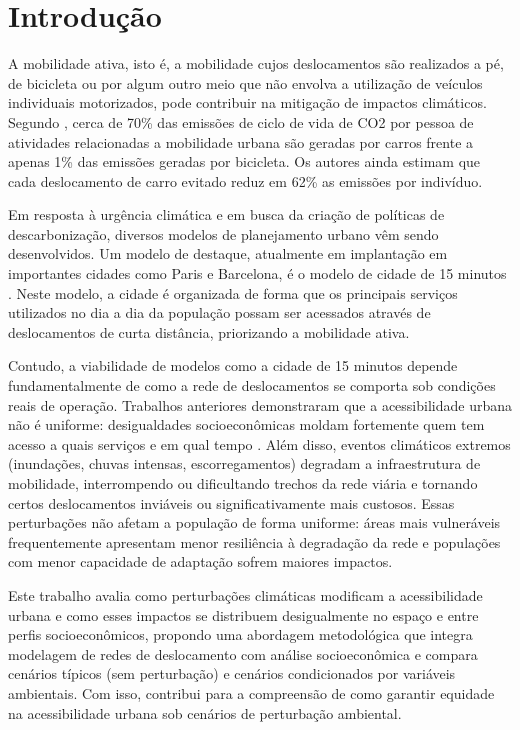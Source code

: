 \section{Introdução}

A mobilidade ativa, isto é, a mobilidade cujos deslocamentos são realizados a pé, de bicicleta ou por algum outro meio que não envolva a utilização de veículos individuais motorizados, pode contribuir na mitigação de impactos climáticos. Segundo \cite{BRAND2021102764}, cerca de 70\% das emissões de ciclo de vida de CO2 por pessoa de atividades relacionadas a mobilidade urbana são geradas por carros frente a apenas 1\% das emissões geradas por bicicleta. Os autores ainda estimam que cada deslocamento de carro evitado reduz em 62\% as emissões por indivíduo.

Em resposta à urgência climática e em busca da criação de políticas de descarbonização, diversos modelos de planejamento urbano vêm sendo desenvolvidos. Um modelo de destaque, atualmente em implantação em importantes cidades como Paris e Barcelona, é o modelo de cidade de 15 minutos \cite{Allam2022-yx}. Neste modelo, a cidade é organizada de forma que os principais serviços utilizados no dia a dia da população possam ser acessados através de deslocamentos de curta distância, priorizando a mobilidade ativa.

Contudo, a viabilidade de modelos como a cidade de 15 minutos depende fundamentalmente de como a rede de deslocamentos se comporta sob condições reais de operação. Trabalhos anteriores demonstraram que a acessibilidade urbana não é uniforme: desigualdades socioeconômicas moldam fortemente quem tem acesso a quais serviços e em qual tempo \cite{sbbd_estendido}. Além disso, eventos climáticos extremos (inundações, chuvas intensas, escorregamentos) degradam a infraestrutura de mobilidade, interrompendo ou dificultando trechos da rede viária e tornando certos deslocamentos inviáveis ou significativamente mais custosos. Essas perturbações não afetam a população de forma uniforme: áreas mais vulneráveis frequentemente apresentam menor resiliência à degradação da rede e populações com menor capacidade de adaptação sofrem maiores impactos.

Este trabalho avalia como perturbações climáticas modificam a acessibilidade urbana e como esses impactos se distribuem desigualmente no espaço e entre perfis socioeconômicos, propondo uma abordagem metodológica que integra modelagem de redes de deslocamento com análise socioeconômica e compara cenários típicos (sem perturbação) e cenários condicionados por variáveis ambientais. Com isso, contribui para a compreensão de como garantir equidade na acessibilidade urbana sob cenários de perturbação ambiental.